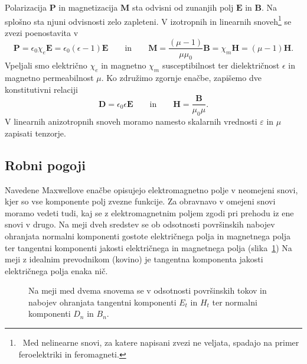 Polarizacija $\mathbf{P}$ in magnetizacija $\mathbf{M}$ sta odvisni od zunanjih polj $\mathbf{E}$
in $\mathbf{B}$. Na splošno sta njuni odvisnosti zelo zapleteni.
V izotropnih in linearnih snoveh\footnote{~Med nelinearne snovi, za katere
napisani zvezi ne veljata, spadajo na primer feroelektriki in feromagneti.}
 se zvezi poenostavita v 
\begin{equation}
\mathbf{P}=\epsilon_{0}\chi_e\mathbf{E} = \epsilon_{0}(\epsilon-1)\mathbf{E} \qquad \textrm{in} 
\qquad
\mathbf{M}=\frac{(\mu-1)}{\mu\mu_0}\mathbf{B} = \chi_m \mathbf{H} = (\mu-1)\mathbf{H}
\label{eq:PM}.
\end{equation}
Vpeljali smo  električno $\chi_e$ in 
magnetno $\chi_m$ susceptibilnost ter
dielektričnost $\epsilon$ in
magnetno permeabilnost $\mu$. Ko združimo zgornje
enačbe, zapišemo dve konstitutivni
relaciji
\begin{equation}
\mathbf{D}  =\epsilon_{0}\epsilon\mathbf{E}\qquad \textrm{in} 
\qquad
\mathbf{H}  =\frac{\mathbf{B}}{\mu_{0}\mu}.
\end{equation}
V linearnih anizotropnih snoveh moramo namesto skalarnih vrednosti $\varepsilon$
in $\mu$ zapisati tenzorje. 

\subsection*{Robni pogoji}
Navedene Maxwellove enačbe opisujejo elektromagnetno polje
v neomejeni snovi, kjer so vse komponente polj zvezne funkcije. Za
obravnavo v omejeni snovi moramo vedeti tudi, kaj se z elektromagnetnim
poljem zgodi pri prehodu iz ene snovi v drugo.
Na meji dveh sredstev se ob odsotnosti površinskih nabojev ohranjata normalni 
komponenti gostote električnega polja in magnetnega polja 
ter tangentni komponenti jakosti
električnega in magnetnega polja (slika~\ref{fig:Robni-pogoji})
Na meji z idealnim prevodnikom (kovino) je tangentna komponenta 
jakosti električnega polja enaka nič.

\begin{figure}[ht]
\centering
  \def\svgwidth{85truemm} 
  
\caption{Na meji med dvema snovema se v odsotnosti površinskih tokov
in nabojev ohranjata tangentni komponenti $E_t$ in $H_t$ ter 
normalni komponenti $D_n$ in $B_n$.}
\label{fig:Robni-pogoji}
\end{figure}

